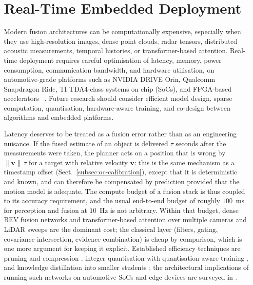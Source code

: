 \documentclass[graybox,envcountchap]{style/SNmono}
\begin{document}
\section{Real-Time Embedded Deployment}
\label{subsec:oc-embedded}

Modern fusion architectures can be computationally expensive, especially when they use high-resolution images, dense point clouds, radar tensors, distributed acoustic measurements, temporal histories, or transformer-based attention. Real-time deployment requires careful optimisation of latency, memory, power consumption, communication bandwidth, and hardware utilisation, on automotive-grade platforms such as NVIDIA DRIVE Orin, Qualcomm Snapdragon Ride, TI TDA4-class systems on chip (SoCs), and FPGA-based accelerators
~\cite{lin2018_architectural,liu2019_edge_computing,sze2017_efficient}.
Future research should consider efficient model design, sparse computation, quantisation, hardware-aware training, and co-design between algorithms and embedded platforms.

Latency deserves to be treated as a fusion error rather than as an engineering nuisance. If the fused estimate of an object is delivered $\tau$ seconds after the measurements were taken, the planner acts on a position that is wrong by $\lVert\mathbf{v}\rVert\,\tau$ for a target with relative velocity $\mathbf{v}$: this is the same mechanism as a timestamp offset (Sect.~\ref{subsec:oc-calibration}), except that it is deterministic and known, and can therefore be compensated by prediction provided that the motion model is adequate. The compute budget of a fusion stack is thus coupled to its accuracy requirement, and the usual end-to-end budget of roughly $100$~ms for perception and fusion at $10$~Hz is not arbitrary. Within that budget, dense BEV fusion networks and transformer-based attention over multiple cameras and LiDAR sweeps are the dominant cost; the classical layer (filters, gating, covariance intersection, evidence combination) is cheap by comparison, which is one more argument for keeping it explicit. Established efficiency techniques are pruning and compression \cite{han2016_deep_compression}, integer quantisation with quantisation-aware training \cite{jacob2018_quantization}, and knowledge distillation into smaller students \cite{hinton2015_distillation}; the architectural implications of running such networks on automotive SoCs and edge devices are surveyed in \cite{lin2018_architectural,liu2019_edge_computing,sze2017_efficient}.
\end{document}
